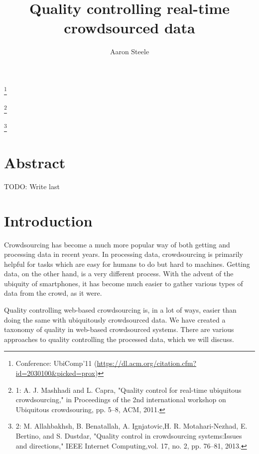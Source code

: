 \documentclass[9pt,twocolumn]{article}
\title{Quality controlling real-time crowdsourced data}
\author{Aaron Steele}
\date{}
\newcommand\blfootnote[1]{%
	\begingroup
	\renewcommand\thefootnote{}\footnote{#1}%
	\addtocounter{footnote}{-1}%
	\endgroup
}
\begin{document}
	\maketitle
	
	\blfootnote{Conference: UbiComp'11 (\url{https://dl.acm.org/citation.cfm?id=2030100&picked=prox}) }
	\blfootnote{1: A. J. Mashhadi and L. Capra, "Quality control for real-time ubiquitous crowdsourcing," in Proceedings of the 2nd international workshop on Ubiquitous crowdsouring, pp. 5–8, ACM, 2011.}
	\blfootnote{2: M. Allahbakhsh, B. Benatallah, A. Ignjatovic,H. R. Motahari-Nezhad, E. Bertino, and S. Dustdar, "Quality control in crowdsourcing systems:Issues and directions," IEEE Internet Computing,vol. 17, no. 2, pp. 76–81, 2013.}
	
	
	
	\section*{Abstract}
	TODO: Write last
	\section*{Introduction}
	Crowdsourcing has become a much more popular way of both getting and processing data in recent years. In processing data, crowdsourcing is primarily helpful for tasks which are easy for humans to do but hard to machines. %
	Getting data, on the other hand, is a very different process. With the advent of the ubiquity of smartphones, it has become much easier to gather various types of data from the crowd, as it were.
	
	Quality controlling web-based crowdsourcing is, in a lot of ways, easier than doing the same with ubiquitously crowdsourced data. We have created a taxonomy of quality in web-based crowdsourced systems. There are various approaches to quality controlling the processed data, which we will discuss.
	
\end{document}
